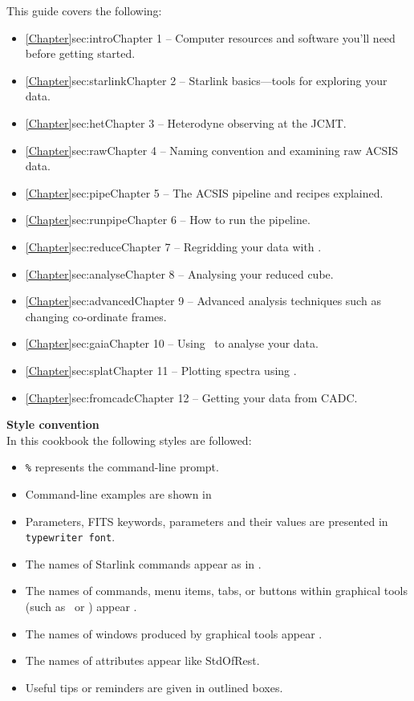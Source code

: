 \documentclass[11pt,oneside,chapters]{starlink}
\providecommand{\att}[1]{\textsf{#1}}
\begin{document}
This guide covers the following:
\begin{itemize}
\itemsep0em
\item \cref{Chapter}{sec:intro}{Chapter 1} -- Computer resources and software you'll need before getting started.
\item \cref{Chapter}{sec:starlink}{Chapter 2} -- Starlink basics---tools for exploring your data.
\item \cref{Chapter}{sec:het}{Chapter 3} -- Heterodyne observing at the JCMT.
\item \cref{Chapter}{sec:raw}{Chapter 4} -- Naming convention and examining raw ACSIS data.
\item \cref{Chapter}{sec:pipe}{Chapter 5} -- The ACSIS pipeline and recipes explained.
\item \cref{Chapter}{sec:runpipe}{Chapter 6} -- How to run the pipeline.
\item \cref{Chapter}{sec:reduce}{Chapter 7} -- Regridding your data with \makecube.
\item \cref{Chapter}{sec:analyse}{Chapter 8} -- Analysing your reduced cube.
\item \cref{Chapter}{sec:advanced}{Chapter 9} -- Advanced analysis techniques such as changing co-ordinate frames.
\item \cref{Chapter}{sec:gaia}{Chapter 10} -- Using \gaia\ to analyse your data.
\item \cref{Chapter}{sec:splat}{Chapter 11} -- Plotting spectra using \splat.
\item \cref{Chapter}{sec:fromcadc}{Chapter 12} -- Getting your data from CADC.
\end{itemize}

\textbf{Style convention}\\
In this cookbook the following styles are followed:
\begin{itemize}[noitemsep,nolistsep]
\item \texttt{\%} represents the command-line prompt.
\item Command-line examples are shown in \texttt{\color{MidnightBlue}{navy typewriter font.}}
\item Parameters, FITS keywords, parameters and their values are presented in \texttt{typewriter font}.
\item The names of Starlink commands appear as in .
\item The names of commands, menu items, tabs, or buttons within graphical tools (such as \gaia\ or
\splat) appear .
\item The names of windows produced by graphical tools appear .
\item The names of attributes appear like \att{StdOfRest}.
\item Useful tips or reminders are given in outlined boxes.
\end{itemize}
\end{document}
